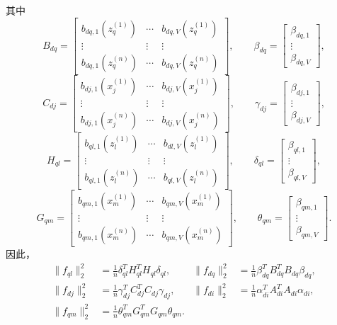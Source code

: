 其中
\[
B_{dq}=\begin{bmatrix}
b_{dq,1}(z_q^{(1)})&\cdots&b_{dq,V}(z_q^{(1)})\\
\vdots&\vdots&\vdots\\
b_{dq,1}(z_q^{(n)})&\cdots&b_{dq,V}(z_q^{(n)})
\end{bmatrix},\qquad
\beta_{dq}=\begin{bmatrix}\beta_{dq,1}\\\vdots\\\beta_{dq,V}\end{bmatrix},
\]
\[
C_{dj}=\begin{bmatrix}
b_{dj,1}(x_j^{(1)})&\cdots&b_{dj,V}(x_j^{(1)})\\
\vdots&\vdots&\vdots\\
b_{dj,1}(x_j^{(n)})&\cdots&b_{dj,V}(x_j^{(n)})
\end{bmatrix},\qquad
\gamma_{dj}=\begin{bmatrix}\beta_{dj,1}\\\vdots\\\beta_{dj,V}\end{bmatrix},
\]
\[
H_{ql}=\begin{bmatrix}
b_{ql,1}(z_l^{(1)})&\cdots&b_{dl,V}(z_l^{(1)})\\
\vdots&\vdots&\vdots\\
b_{ql,1}(z_l^{(n)})&\cdots&b_{ql,V}(z_l^{(n)})
\end{bmatrix},\qquad
\delta_{ql}=\begin{bmatrix}\beta_{ql,1}\\\vdots\\\beta_{ql,V}\end{bmatrix},
\]
\[
G_{qm}=\begin{bmatrix}
b_{qm,1}(x_m^{(1)})&\cdots&b_{qm,V}(x_m^{(1)})\\
\vdots&\vdots&\vdots\\
b_{qm,1}(x_m^{(n)})&\cdots&b_{qm,V}(x_m^{(n)})
\end{bmatrix},\qquad
\theta_{qm}=\begin{bmatrix}\beta_{qm,1}\\\vdots\\\beta_{qm,V}\end{bmatrix}.
\]
因此，
\begin{equation}
\begin{aligned}
\|f_{ql}\|_2^2&=\frac1n\delta_{ql}^TH_{ql}^TH_{ql}\delta_{ql},&
\|f_{dq}\|_2^2&=\frac1n\beta_{dq}^TB_{dq}^TB_{dq}\beta_{dq},\\
\|f_{dj}\|_2^2&=\frac1n\gamma_{dj}^TC_{dj}^TC_{dj}\gamma_{dj},&
\|f_{di}\|_2^2&=\frac1n\alpha_{di}^TA_{di}^TA_{di}\alpha_{di},\\
\|f_{qm}\|_2^2&=\frac1n\theta_{qm}^TG_{qm}^TG_{qm}\theta_{qm}.&&
\end{aligned}
\tag{7.214}
\end{equation}

